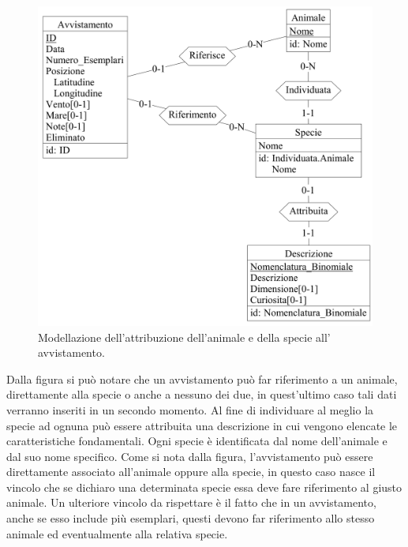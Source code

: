 \documentclass[a4paper,final,12pt]{report}
\begin{document}
\begin{figure}[hbtp]
\centering
\includegraphics[scale=0.10]{img_concettuale/avvistamento2.png}
\caption{Modellazione dell'attribuzione dell'animale e della specie all' avvistamento.}
\end{figure}

Dalla figura si può notare che un avvistamento può far riferimento a un animale, direttamente alla specie o anche a nessuno dei due, in quest'ultimo caso tali dati verranno inseriti in un secondo momento. Al fine di individuare al meglio la specie ad ognuna può essere attribuita una descrizione in cui vengono elencate le caratteristiche fondamentali. Ogni specie è identificata dal nome dell'animale e dal suo nome specifico. Come si nota dalla figura, l'avvistamento può essere direttamente associato all'animale oppure alla specie, in questo caso nasce il vincolo che se dichiaro una determinata specie essa deve fare  riferimento al giusto animale. Un ulteriore vincolo da rispettare è il fatto che in un avvistamento, anche se esso include più esemplari, questi devono far riferimento allo stesso animale ed eventualmente alla relativa specie.
\end{document}
